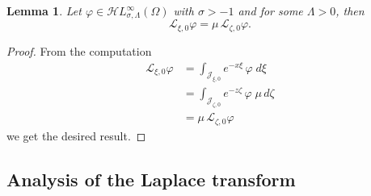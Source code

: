 \documentclass{article}
\newcommand{\singexp}[2]{\mathcal{H}L^\infty_{#1, #2}}
\newcommand{\laplace}{\mathcal{L}}
\theoremstyle{definition}
\theoremstyle{plain}
\newtheorem{lemma}[definition]{Lemma}
\begin{document}
\begin{lemma}
Let $\varphi\in\singexp{\sigma}{\Lambda}(\Omega)$ with $\sigma>-1$ and for some $\Lambda>0$, then
    \[ \laplace_{\xi, 0} \varphi = \mu\,\laplace_{\zeta, 0} \varphi. \]
\end{lemma}
\begin{proof}
    From the computation 
    \begin{align*}
\laplace_{\xi, 0} \varphi & = \int_{\mathcal{J}_{\xi, 0}} e^{-x\xi}\,\varphi\;d\xi \\
& = \int_{\mathcal{J}_{\zeta, 0}} e^{-z \zeta}\,\varphi\;\mu\,d\zeta \\
& = \mu\,\laplace_{\zeta, 0} \varphi
\end{align*}
we get the desired result. 
\end{proof}
%
\subsection{Analysis of the Laplace transform}\label{sec:laplace_analytic}
%
\end{document}
